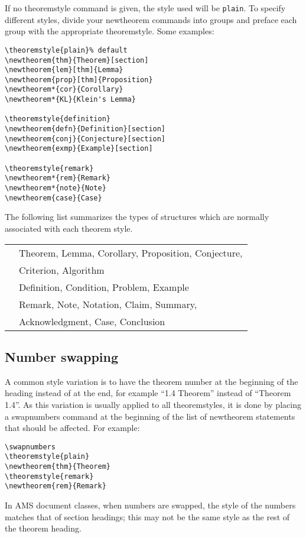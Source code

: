 \documentclass[twoside]{article}
\providecommand{\qq}[1]{\textquotedblleft#1\textquotedblright}
\newcommand{\ntt}{%
  \fontfamily\ttdefault \fontseries\mddefault \fontshape\updefault
  \selectfont
}
\DeclareRobustCommand{\cn}[1]{{\ntt\bslchar#1}}
\DeclareRobustCommand{\env}[1]{{\ntt#1}}
\begin{document}
If no \cn{theoremstyle} command is given, the style used will be
\texttt{plain}. To specify different styles,
divide your \cn{new\-theorem} commands into groups and preface each
group with the appropriate \cn{theo\-rem\-style}. Some examples:
\begin{verbatim}
\theoremstyle{plain}% default
\newtheorem{thm}{Theorem}[section]
\newtheorem{lem}[thm]{Lemma}
\newtheorem{prop}[thm]{Proposition}
\newtheorem*{cor}{Corollary}
\newtheorem*{KL}{Klein's Lemma}

\theoremstyle{definition}
\newtheorem{defn}{Definition}[section]
\newtheorem{conj}{Conjecture}[section]
\newtheorem{exmp}{Example}[section]

\theoremstyle{remark}
\newtheorem*{rem}{Remark}
\newtheorem*{note}{Note}
\newtheorem{case}{Case}
\end{verbatim}

The following list summarizes the types of structures which are
normally associated with each theorem style.

\smallskip
\begin{tabular}{ll}
 \relax\env{plain} & Theorem, Lemma, Corollary, Proposition, Conjecture, \\
                   & Criterion, Algorithm \\
 \relax\env{definition} \quad & Definition, Condition, Problem, Example \\
 \relax\env{remark} & Remark, Note, Notation, Claim, Summary, \\
                    & Acknowledgment, Case, Conclusion
\end{tabular}

\subsection{Number swapping}

A common style variation is to have the theorem number at the beginning
of the heading instead of at the end, for example \qq{1.4 Theorem}
instead of \qq{Theorem 1.4}.  As this variation is usually applied
to all \cn{theoremstyle}s, it is done by
placing a \cn{swapnumbers} command at the beginning of the list of
\cn{newtheorem} statements that should be affected. For example:
\begin{verbatim}
\swapnumbers
\theoremstyle{plain}
\newtheorem{thm}{Theorem}
\theoremstyle{remark}
\newtheorem{rem}{Remark}
\end{verbatim}

In AMS document classes, when numbers are swapped, the style of the
numbers matches that of section headings; this may not be the same
style as the rest of the theorem heading.
\end{document}
